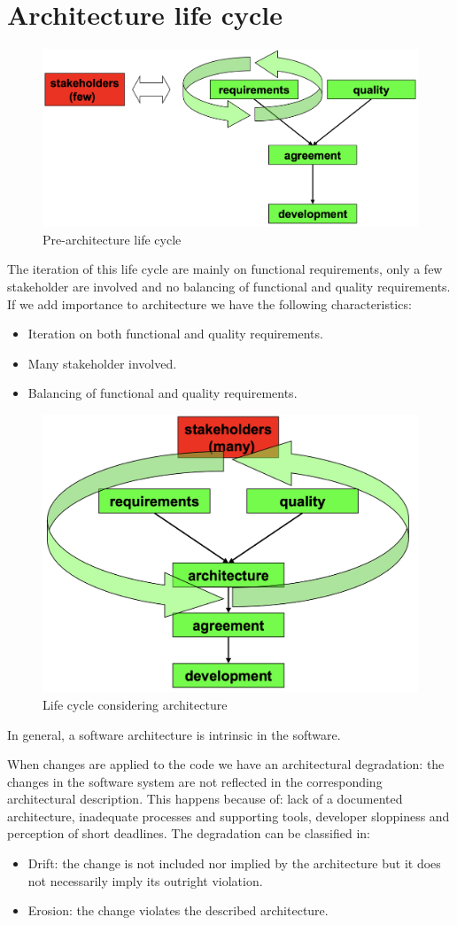 \documentclass[12pt, a4paper]{report}
\theoremstyle{remark}
\begin{document}
\section{Architecture life cycle}
    \begin{figure}
        \centering
        \includegraphics[width=1\linewidth]{images/archlife.png}
        \caption{Pre-architecture life cycle}
    \end{figure}
    The iteration of this life cycle are mainly on functional requirements, only a few stakeholder are involved and no balancing of functional and quality requirements. If we add importance to architecture we have the following characteristics: 
    \begin{itemize}
        \item Iteration on both functional and quality requirements.
        \item Many stakeholder involved.
        \item Balancing of functional and quality requirements.
    \end{itemize}
    \begin{figure}
        \centering
        \includegraphics[width=0.5\linewidth]{images/archlife_1.png}
        \caption{Life cycle considering architecture}
    \end{figure}
    In general, a software architecture is intrinsic in the software. 
    \par
    When changes are applied to the code we have an architectural degradation: the changes in the software system are not reflected in the corresponding architectural description. This happens because of: lack of a documented architecture, inadequate processes and supporting tools, developer sloppiness and perception of short deadlines. The degradation can be classified in:
    \begin{itemize}
        \item Drift: the change is not included nor implied by the architecture but it does not necessarily imply its outright violation.
        \item Erosion: the change violates the described architecture.
    \end{itemize}
\end{document}
